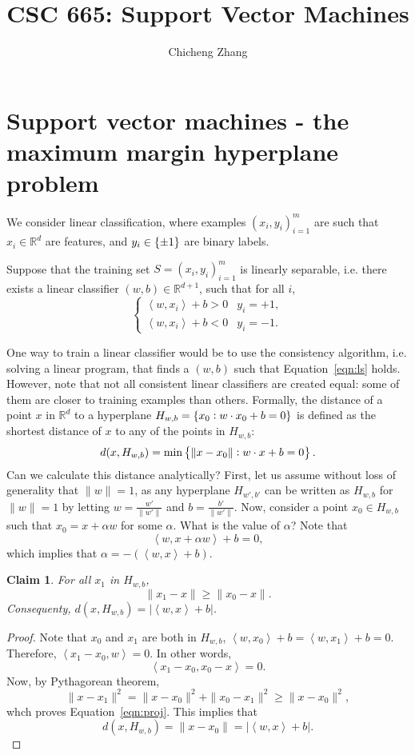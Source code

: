 \documentclass{article}
\title{CSC 665: Support Vector Machines}
\author{Chicheng Zhang}
\newtheorem{claim}{Claim}
\newcommand{\RR}{\mathbb{R}} %
\newcommand{\inner}[2]{\left\langle #1,#2 \right\rangle}
\begin{document}
\maketitle

\section{Support vector machines - the maximum margin hyperplane problem}
We consider linear classification, where examples $(x_i,y_i)_{i=1}^m$ are such that
$x_i \in \RR^d$ are features, and $y_i \in \cbr{\pm 1}$ are binary labels.

Suppose that the training set $S = (x_i,y_i)_{i=1}^m$ is linearly separable, i.e.
there exists a linear classifier $(w,b) \in \RR^{d+1}$, such that for all $i$,
\begin{equation}
  \begin{cases} \inner{w}{x_i} + b > 0 & y_i = +1, \\ \inner{w}{x_i} + b < 0 & y_i = -1. \end{cases}
    \label{eqn:ls}
  \end{equation}

One way to train a linear classifier would be to use the consistency algorithm, i.e.
solving a linear program, that finds a $(w,b)$ such that Equation~\eqref{eqn:ls} holds.
However, note that not all consistent linear classifiers are created equal: some of them are closer to training examples than others. Formally, the distance of a point $x$ in $\RR^d$ to a hyperplane $H_{w,b} = \cbr{x_0: w \cdot x_0 + b = 0}$ is defined as the shortest distance of $x$ to any of the points in $H_{w,b}$:
\begin{equation}
  d(x, H_{w,b}) = \min\cbr{\|x - x_0\|: w \cdot x + b = 0}.
\end{equation}
Can we calculate this distance analytically? First, let us assume without loss of generality that $\| w \| = 1$, as any hyperplane $H_{w',b'}$ can be written as $H_{w,b}$ for $\| w \| = 1$ by letting $w = \frac{w'}{\|w'\|}$ and $b = \frac{b'}{\|w'\|}$. Now, consider a point $x_0 \in H_{w,b}$ such that $x_0 = x + \alpha w$ for some $\alpha$. What is the value of $\alpha$? Note that
\[ \inner{w}{x + \alpha w} + b = 0, \]
which implies that $\alpha = -(\inner{w}{x} + b)$.
\begin{claim}
For all $x_1$ in $H_{w,b}$,
\begin{equation}
  \| x_1 - x \| \geq \| x_0 - x\|.
  \label{eqn:proj}
\end{equation}
Consequenty, $d(x, H_{w,b}) = |\inner{w}{x} + b|$.
\end{claim}
\begin{proof}
Note that $x_0$ and $x_1$ are both in $H_{w,b}$, $\inner{w}{x_0} + b = \inner{w}{x_1} + b = 0$. Therefore,
$\inner{x_1 - x_0}{w} = 0$. In other words,
\[ \inner{x_1 - x_0}{x_0 - x} = 0. \]
Now, by Pythagorean theorem,
\[ \| x - x_1 \|^2 = \| x - x_0 \|^2 + \| x_0 - x_1 \|^2 \geq \| x - x_0 \|^2,  \]
whch proves Equation~\eqref{eqn:proj}. This implies that
\[ d(x, H_{w,b}) = \| x - x_0 \| = |\inner{w}{x} + b|. \]
\end{proof}
\end{document}
